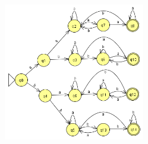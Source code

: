 \documentclass[12pt]{article}
\begin{document}
\begin{spacing}{1.5}
\begin{enumerate}
\begin{enumerate}
			            \begin{figure}[h!]
				            \centering
				            \includegraphics[width=0.55\textwidth]{img/q3/q3_f.png}
			            \end{figure}
		      \end{enumerate}

	\end{enumerate}

\end{spacing}
\end{document}
